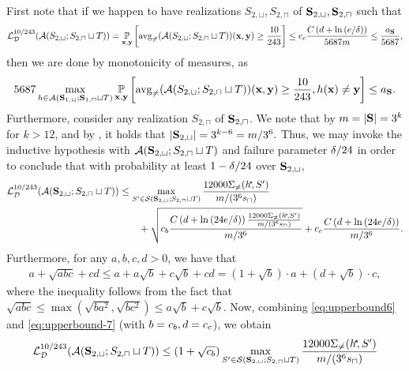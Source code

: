 \begin{proofof}{}
First note that if we happen to have realizations $ S_{2,\sqcup},S_{2,\sqcap} $ of $  \mathbf{S}_{2,\sqcup},\mathbf{S}_{2,\sqcap}$ such that 
\begin{align*}
 \operatorname{\mathcal{L}}_{\mathcal{D}}^{10/243}(\mathcal{A}(S_{2,\sqcup};S_{2,\sqcap}\sqcup T))=\operatorname*{\mathbb{P}}_{\mathbf{x},\mathbf{y}}\left[\operatorname{\mathrm{avg}_{\not=}}(\mathcal{A}(S_{2,\sqcup};S_{2,\sqcap}\sqcup T))(\mathbf{x},\mathbf{y})\geq \frac{10}{243}\right]\leq c_c\frac{C\left(d+\ln{(e/\delta )}\right)}{5687m}\leq \frac{a_{\mathbf{S}}}{5687},
\end{align*} 
then we are done by monotonicity of measures, as 
\begin{align}\label{eq:upperbound9}
5687\max_{h\in \mathcal{A}(\mathbf{S}_{1,\sqcup};\mathbf{S}_{1,\sqcap}\sqcup T)}\operatorname*{\mathbb{P}}_{\mathbf{x},\mathbf{y}}\left[\operatorname{\mathrm{avg}_{\not=}}(\mathcal{A}(S_{2,\sqcup};S_{2,\sqcap}\sqcup T))(\mathbf{x},\mathbf{y})\geq \frac{10}{243},h(\mathbf{x})\not=\mathbf{y}\right]\leq  a_{\mathbf{S}}.
\end{align}
Furthermore, consider any realization $ S_{2,\sqcap} $ of $ \mathbf{S}_{2,\sqcap} $. 
We note that by $ m=|\mathbf{S}|=3^{k}$ for $ k>12$, and by , it holds that $ |\mathbf{S}_{2,\sqcup}| =3^{k-6}=m/3^{6}.$ 
Thus, we may invoke the inductive hypothesis with $\mathcal{A}( \mathbf{S}_{2,\sqcup}  ;  S_{2,\sqcap} \sqcup T)$ and failure parameter $\delta/24$ in order to conclude that with probability at least $ 1-\delta/24 $ over $ \mathbf{S}_{2,\sqcup} $,
\begin{align}\label{eq:upperbound6}
\operatorname{\mathcal{L}}_{\mathcal{D}}^{10/243}(\mathcal{A}(\mathbf{S}_{2,\sqcup};S_{2,\sqcap}\sqcup T))
& \leq
\max\limits_{S'\in\mathcal{S}(\mathbf{S}_{2,\sqcup};S_{2,\sqcap}\sqcup T)} 
\frac{12000\Sigma_{\not=}(h^{\negmedspace\star}\negmedspace,S')}{m/(3^6 s_{\sqcap})} \notag \\
&\qquad +\sqrt{c_b \frac{C\left(d+\ln{(24e/\delta  )}\right)
\frac{12000\Sigma_{\not=}(h^{\negmedspace\star}\negmedspace,S')}{m/(3^6 s_{\sqcap})}}{m/3^6}}
+c_c\frac{C\left(d+\ln{\left(24e/\delta  \right)}\right)}{m/3^6}. 
\end{align}
Furthermore, for any $a,b,c,d>0 $, we have that 
\begin{align}\label{eq:upperbound-7}
a+\sqrt{abc}+cd
 \leq a+a\sqrt{b} +c\sqrt{b}+ cd
 =(1+\sqrt{b})\cdot a+(d+\sqrt{b})\cdot c,
\end{align}
where the inequality follows from the fact that $\sqrt{abc}\leq \max(\sqrt{ba^2},\sqrt{bc^2})\leq a\sqrt{b}+c\sqrt{b}$.
Now, combining \cref{eq:upperbound6} and \cref{eq:upperbound-7} (with $ b=c_b,d=c_c $), we obtain
\begin{align}\label{eq:upperbound10}
    \ls_{\cD}^{10/243}(\erm(\rS_{2,\sqcup};S_{2,\sqcap}\sqcup T)) & \leq  (1+\sqrt{\cb})\max\limits_{S'\in\cS(\rS_{2,\sqcup};S_{2,\sqcap}\sqcup T)} 
    \frac{12000\Sigma_{\not=}(\hs\negmedspace,S')}{m/(3^6 s_{\sqcap})} \notag \\ 

\end{align}
\end{proofof}
